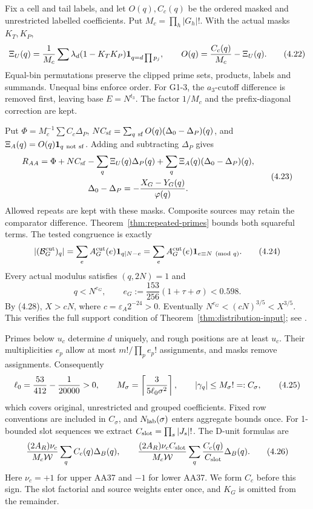 Fix a cell and tail labels, and let $O(q),C_c(q)$ be the ordered masked and unrestricted labelled coefficients.
Put $M_c=\prod_h|G_h|!$.
With the actual masks $K_T,K_P$,
\[
 \Xi_U(q)={1\over M_c}\sum\lambda_d(1-K_TK_P)
                  \mathbf1_{q=d\prod p_j},\qquad
 O(q)={C_c(q)\over M_c}-\Xi_U(q).
 \tag{4.22}
\]
Equal-bin permutations preserve the clipped prime sets, products, labels and summands.
Unequal bins enforce order.
For G1-3, the $a_3$-cutoff difference is removed first, leaving base $E=N^{t_3}$.
The factor $1/M_c$ and the prefix-diagonal correction are kept.

Put $\Phi=M_c^{-1}\sum C_c\Delta_P$,
$NC_{\rm sf}=\sum_{q\ {\rm sf}}O(q)(\Delta_0-\Delta_P)(q)$,
and $\Xi_A(q)=O(q)\mathbf1_{q\ {\rm not\ sf}}$.
Adding and subtracting $\Delta_P$ gives
\[
\begin{gathered}
 R_{AA}=\Phi+NC_{\rm sf}-\sum_q\Xi_U(q)\Delta_P(q)
                   +\sum_q\Xi_A(q)(\Delta_0-\Delta_P)(q),\\
 \Delta_0-\Delta_P=-{X_G-Y_G(q)\over\varphi(q)}.
\end{gathered}
 \tag{4.23}
\]
Allowed repeats are kept with these masks.
Composite sources may retain the comparator difference.
Theorem~\ref{thm:repeated-primes} bounds both squareful terms.
The tested congruence is exactly
\[
 |(\mathcal B_G^{\rm cut})_q|
 =\sum_eA_G^{\rm cut}(e)\mathbf1_{q\mid N-e}
 =\sum_eA_G^{\rm cut}(e)\mathbf1_{e\equiv N\pmod q}.
 \tag{4.24}
\]
Every actual modulus satisfies $(q,2N)=1$ and
\[
 q<N^{e_G},\qquad e_G:=\frac{153}{256}(1+\tau+\sigma)<0.598.
\]
By (4.28), $X>cN$, where $c=\varepsilon_A2^{-24}>0$.
Eventually $N^{e_G}<(cN)^{3/5}<X^{3/5}$.
This verifies the full support condition of Theorem~\ref{thm:distribution-input};
see \cite[Theorem~3.2, (H3)]{Z1}.

Primes below $u_c$ determine $d$ uniquely, and rough positions are at least $u_c$.
Their multiplicities $e_p$ allow at most $m!/\prod_pe_p!$ assignments, and masks remove assignments.
Consequently
\[
 \ell_0={53\over412}-{1\over20000}>0,\qquad
 M_\sigma=\left\lceil{3\over5\ell_0\sigma^2}\right\rceil,\qquad
 |\gamma_q|\le M_\sigma! =: C_\sigma,
 \tag{4.25}
\]
which covers original, unrestricted and grouped coefficients.
Fixed row conventions are included in $C_\sigma$,
and $N_{\rm lab}(\sigma)$ enters aggregate bounds once.
For 1-bounded slot sequences we extract $C_{\rm slot}=\prod_s|J_s|!$.
The D-unit formulas are
\[
 {(2A_R)\nu_c\over M_c\mathcal W}\sum_qC_c(q)\Delta_B(q),
 \qquad
 {(2A_R)\nu_c C_{\rm slot}\over M_c\mathcal W}
                  \sum_q{C_c(q)\over C_{\rm slot}}\Delta_B(q).
 \tag{4.26}
\]
Here $\nu_c=+1$ for upper AA37 and $-1$ for lower AA37.
We form $C_c$ before this sign.
The slot factorial and source weights enter once, and $K_G$ is omitted from the remainder.

